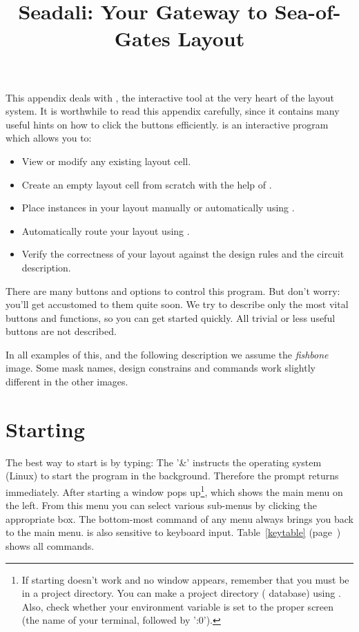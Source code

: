 \title{Seadali: Your Gateway to Sea-of-Gates Layout}
\maketitle
\label{s-seadali}
This appendix deals with , the interactive tool at the very heart
of the  layout system.  It is worthwhile to read this appendix
carefully, since it contains many useful hints on how to click the buttons
efficiently.
 is an interactive program which allows you to:
\begin{itemize}
\item
View or modify any existing layout cell.
\item
Create an empty layout cell from scratch with the help of .
\item
Place instances in your layout manually or automatically using .
\item
Automatically route your layout using .
\item
Verify the correctness of your layout against the design rules and the circuit
description.
\end{itemize}
There are many buttons and options to control this program.  But don't worry:
you'll get accustomed to them quite soon.  We try to describe only the most
vital buttons and functions, so you can get started quickly. All trivial or
less useful buttons are not described.

In all examples of this, and the following description we assume the {\sl fishbone} image.
Some mask names, design constrains and commands work slightly
different in the other images. 

\section{Starting \protect{}}
\label{s-start-seadali}
The best way to start  is by typing:
The '\&' instructs the operating system (Linux) to start the program in the background.
Therefore the prompt returns immediately.
After starting a window pops up\footnote{If starting  doesn't
work and no window appears, remember that you must be in 
a project directory. You can make a project directory ( database) using .
Also, check whether your  environment variable is
set to the proper screen (the name of your terminal, followed by ':0').},
which shows the main menu on the left.
From this menu you can select various sub-menus by clicking the
appropriate box.
The bottom-most command of any menu always brings you back
to the main menu.  is also sensitive to keyboard input.
Table~\ref{keytable} (page~\pageref{keytable}) shows all commands.

